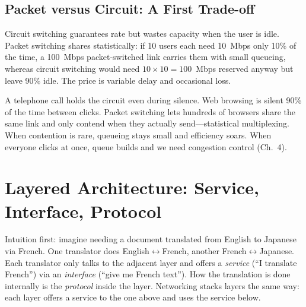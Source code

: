 \subsection{Packet versus Circuit: A First Trade-off}
Circuit switching guarantees rate but wastes capacity when the user is idle. Packet switching shares statistically: if 10 users each need 10~Mbps only 10\% of the time, a 100~Mbps packet-switched link carries them with small queueing, whereas circuit switching would need $10\times10=100$~Mbps reserved anyway but leave 90\% idle. The price is variable delay and occasional loss.

\begin{example}
A telephone call holds the circuit even during silence. Web browsing is silent 90\% of the time between clicks. Packet switching lets hundreds of browsers share the same link and only contend when they actually send---statistical multiplexing. When contention is rare, queueing stays small and efficiency soars. When everyone clicks at once, queue builds and we need congestion control (Ch.~4).
\end{example}

\section{Layered Architecture: Service, Interface, Protocol}
\label{sec:layers}
Intuition first: imagine needing a document translated from English to Japanese via French. One translator does English$\leftrightarrow$French, another French$\leftrightarrow$Japanese. Each translator only talks to the adjacent layer and offers a \emph{service} (``I translate French'') via an \emph{interface} (``give me French text''). How the translation is done internally is the \emph{protocol} inside the layer. Networking stacks layers the same way: each layer offers a service to the one above and uses the service below.

